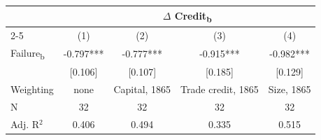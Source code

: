 {
\def\sym#1{\ifmmode^{#1}\else\(^{#1}\)\fi}
\begin{tabular}{l*{4}{c}}
\toprule
            &\multicolumn{4}{c}{$\Delta$ Credit\textsubscript{b}}           \\\cmidrule(lr){2-5}
            &\multicolumn{1}{c}{(1)}   &\multicolumn{1}{c}{(2)}   &\multicolumn{1}{c}{(3)}   &\multicolumn{1}{c}{(4)}   \\
\midrule
Failure\textsubscript{b}&      -0.797***&      -0.777***&      -0.915***&      -0.982***\\
            &     [0.106]   &     [0.107]   &     [0.185]   &     [0.129]   \\
\midrule
Weighting   &        none   &Capital, 1865   &Trade credit, 1865   &  Size, 1865   \\
N           &          32   &          32   &          32   &          32   \\
Adj. R{$^2$}&       0.406   &       0.494   &       0.335   &       0.515   \\
\bottomrule
\end{tabular}
}

